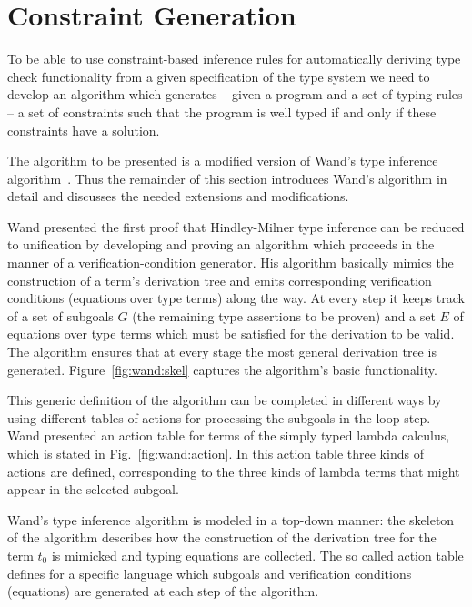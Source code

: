 \section{Constraint Generation}

To be able to use constraint-based inference rules for automatically
deriving type check functionality from a given specification of the
type system we need to develop an algorithm which generates -- given a
program and a set of typing rules -- a set of constraints such that
the program is well typed if and only if these constraints have a
solution.

The algorithm to be presented is a modified version of Wand's type
inference algorithm~\cite{Wand87}. Thus the remainder of this section
introduces Wand's algorithm in detail and discusses the needed
extensions and modifications.



Wand presented the first proof that Hindley-Milner type inference can
be reduced to unification by developing and proving an algorithm which
proceeds in the manner of a verification-condition generator. His
algorithm basically mimics the construction of a term's derivation
tree and emits corresponding verification conditions (equations over
type terms) along the way. At every step it keeps track of a set of
subgoals $G$ (the remaining type assertions to be proven) and a set
$E$ of equations over type terms which must be satisfied for the
derivation to be valid.  The algorithm ensures that at every stage the
most general derivation tree is generated. Figure~\ref{fig:wand:skel}
captures the algorithm's basic functionality.

This generic definition of the algorithm can be completed in different
ways by using different tables of actions for processing the subgoals
in the loop step. Wand presented an action table for terms of the
simply typed lambda calculus, which is stated in
Fig.~\ref{fig:wand:action}. In this action table three kinds of
actions are defined, corresponding to the three kinds of lambda terms
that might appear in the selected subgoal.



Wand's type inference algorithm is modeled in a top-down manner: the
skeleton of the algorithm describes how the construction of the
derivation tree for the term $t_{0}$ is mimicked and typing equations
are collected.  The so called action table defines for a specific
language which subgoals and verification conditions (equations) are
generated at each step of the algorithm.

